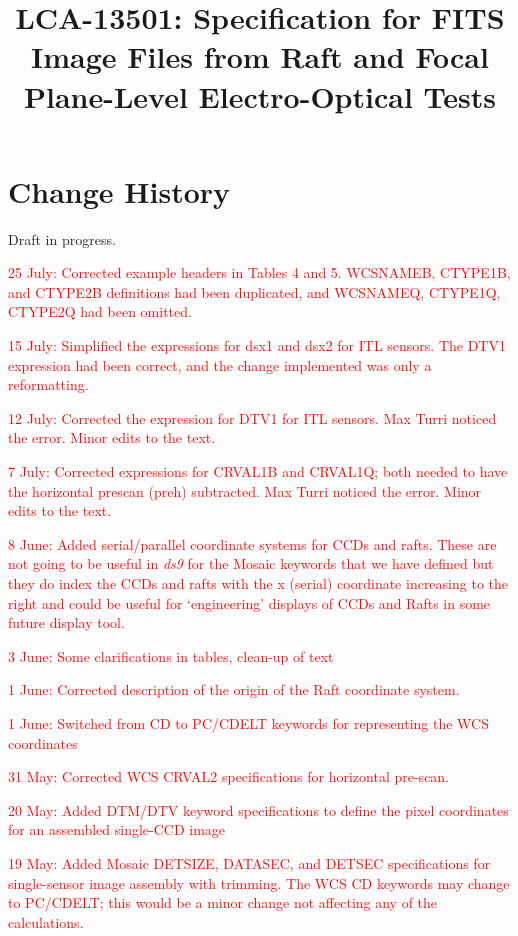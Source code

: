 \documentclass{article}[12pt]
\title{LCA-13501:  Specification for FITS Image Files from Raft and Focal Plane-Level Electro-Optical Tests}
\newcommand{\red}{\textcolor{red}}
\begin{document}
\maketitle
\tableofcontents
\newpage
\listoftables

\section{Change History}
Draft in progress. %

\red{25 July: Corrected example headers in Tables 4 and 5.  WCSNAMEB, CTYPE1B, and CTYPE2B definitions had been duplicated, and WCSNAMEQ, CTYPE1Q, CTYPE2Q had been omitted.}

\red{15 July: Simplified the expressions for dsx1 and dsx2 for ITL sensors.  The DTV1 expression had been correct, and the change implemented was only a reformatting.}
  
\red{12 July:  Corrected the expression for DTV1 for ITL sensors.  Max Turri noticed the error.  Minor edits to the text.}

\red{7 July:  Corrected expressions for CRVAL1B and CRVAL1Q; both needed to have the horizontal prescan (preh) subtracted.  Max Turri noticed the error.  Minor edits to the text.}

\red{8 June:  Added serial/parallel coordinate systems for CCDs and rafts.  These are not going to be useful in {\it ds9} for the Mosaic keywords that we have defined but they do index the CCDs and rafts with the x (serial) coordinate increasing to the right and could be useful for `engineering' displays of CCDs and Rafts in some future display tool.}  
 
\red{3 June:  Some clarifications in tables, clean-up of text}

\red{1 June:  Corrected description of the origin of the Raft coordinate system.}

\red{1 June:  Switched from CD to PC/CDELT keywords for representing the WCS coordinates} 

\red{31 May:  Corrected WCS CRVAL2 specifications for horizontal pre-scan.}

\red{20 May:  Added DTM/DTV keyword specifications to define the pixel coordinates for an assembled single-CCD image}

\red{19 May:  Added Mosaic DETSIZE, DATASEC, and DETSEC specifications for single-sensor image assembly with trimming.  The WCS CD keywords may change to PC/CDELT; this would be a minor change not affecting any of the calculations.}
\end{document}
